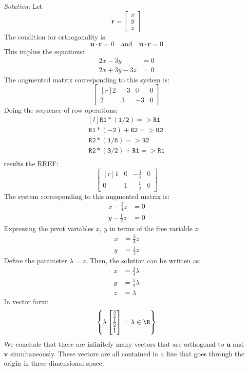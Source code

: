 \documentclass[12pt]{article}
\begin{document}
\begin{enumerate}
\emph{Solution}:
Let
\[
\mathbf{r}=\begin{bmatrix}x\\y\\z\end{bmatrix}
\]
The condition for orthogonality is:
\[
\mathbf{u}\cdot\mathbf{r}=0\quad\text{and}\quad\mathbf{u}\cdot\mathbf{r}=0
\]
This implies the equations:
\begin{align*}
2x-3y&=0\\
2x+3y-3z&=0
\end{align*}
The augmented matrix corresponding to this system is:
\[
\left[\begin{matrix*}[r]2 & -3 & 0 & 0\\2 & 3 & -3 & 0\end{matrix*}\right]
\]
Doing the sequence of row operations:
\[
\begin{matrix*}[l]
\mathtt{R1*(1/2)=>R1}\\
\mathtt{R1*(-2)+R2=>R2}\\
\mathtt{R2*(1/6)=>R2}\\
\mathtt{R2*(3/2)+R1=>R1}\\
\end{matrix*}
\]
results the RREF:
\[
\left[\begin{matrix*}[r]1 & 0 & - \frac{3}{4} & 0\\0 & 1 & - \frac{1}{2} & 0\end{matrix*}\right]
\]
The system corresponding to this augmented matrix is:
\begin{align*}
x-\frac{3}{4}z&=0\\
y-\frac{1}{2}z&=0
\end{align*}
Expressing the pivot variables $x$, $y$ in terms of the free variable $z$:
\begin{align*}
x&=\frac{3}{4}z\\
y&=\frac{1}{2}z
\end{align*}
Define the parameter $\lambda=z$. Then, the solution can be written as:
\begin{align*}
x&=\frac{3}{4}\lambda\\
y&=\frac{1}{2}\lambda\\
z&=\lambda
\end{align*}
In vector form:
\[
\left\{
\lambda\begin{bmatrix}\frac{3}{4}\\\frac{1}{2}\\1\end{bmatrix}
\;:\;\lambda\in\R
\right\}
\]
We conclude that there are infinitely many vectors that are orthogonal to $\mathbf{u}$ and $\mathbf{v}$ simultaneously. These vectors are all contained in a line that goes through the origin in three-dimensional space.
\proofend

\end{enumerate}
\end{document}

